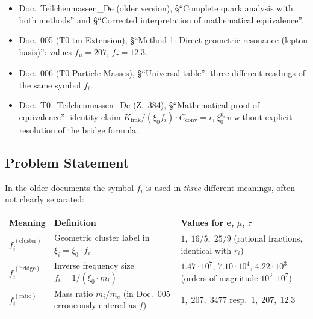 \begin{itemize}
  \item Doc.~Teilchenmassen\_De (older version), §\enquote{Complete
        quark analysis with both methods} and §\enquote{Corrected
        interpretation of mathematical equivalence}.
  \item Doc.~005 (T0-tm-Extension), §\enquote{Method 1: Direct
        geometric resonance (lepton basis)}: values $f_\mu = 207$,
        $f_\tau = 12.3$.
  \item Doc.~006 (T0-Particle Masses), §\enquote{Universal table}:
        three different readings of the same symbol $f_i$.
  \item Doc.~T0\_Teilchenmassen\_De (Z.~384), §\enquote{Mathematical
        proof of equivalence}: identity claim
        $K_{\text{frak}}/(\xi_0 f_i)\cdot C_{\text{conv}}
        = r_i\,\xi_0^{p_i}\,v$
        without explicit resolution of the bridge formula.
\end{itemize}

\subsection*{Problem Statement}

In the older documents the symbol $f_i$ is used in \emph{three}
different meanings, often not clearly separated:

\begin{center}
\renewcommand{\arraystretch}{1.4}
{\footnotesize
\begin{tabular}{>{\raggedright\arraybackslash}p{2.8cm}>{\raggedright\arraybackslash}p{4.6cm}>{\raggedright\arraybackslash}p{5.0cm}}
\toprule
\textbf{Meaning} & \textbf{Definition} & \textbf{Values for e, $\mu$, $\tau$} \\
\midrule
$f_i^{\,(\text{cluster})}$ &
  Geometric cluster label in $\xi_i = \xi_0\cdot f_i$ &
  $1,\;16/5,\;25/9$ (rational fractions, identical with $r_i$) \\
$f_i^{\,(\text{bridge})}$ &
  Inverse frequency size $f_i = 1/(\xi_0 \cdot m_i)$ &
  $1.47\!\cdot\!10^7$, $7.10\!\cdot\!10^4$, $4.22\!\cdot\!10^3$ (orders of magnitude $10^3$--$10^7$) \\
$f_i^{\,(\text{ratio})}$ &
  Mass ratio $m_i/m_e$ (in Doc.~005 erroneously entered as $f$) &
  $1,\;207,\;3477$ resp.\ $1,\;207,\;12.3$ \\
\bottomrule
\end{tabular}
}
\renewcommand{\arraystretch}{1.0}
\end{center}

